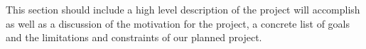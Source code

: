 This section should include a high level description of the project will
accomplish as well as a discussion of the motivation for the project, a concrete
list of goals and the limitations and constraints of our planned project.

